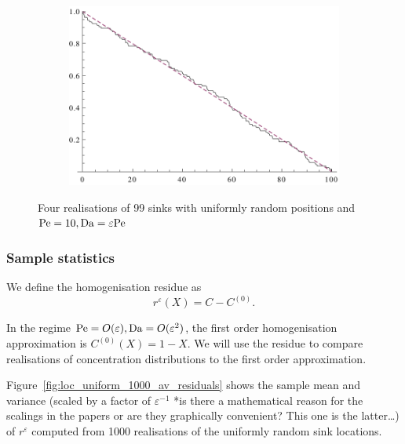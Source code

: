 \begin{figure}[ht!]
\begin{subfigure}[b]{0.45\textwidth}
    \end{subfigure}
    \begin{subfigure}[b]{0.45\textwidth}
        \centering
        \includegraphics[scale=0.5]{continuum/figures/loc_uniform_dist/4}
    \end{subfigure}
    \caption{\label{fig:99_sinks_uni_pos}Four realisations of 99 sinks with
    uniformly random positions and
        \({\mathrm{Pe}=10}, {\mathrm{Da}=\varepsilon\mathrm{Pe}}\)}
\end{figure}

\FloatBarrier

\subsubsection{Sample statistics}
We define the homogenisation residue as
\begin{equation}
    \label{eqn:homogenisation_residue}
    r^\varepsilon(X) = C - C^{(0)}.
\end{equation}

In the regime \(\mathrm{Pe} = O(\varepsilon), \mathrm{Da} = O(\varepsilon^2)\), the
first order homogenisation approximation is \(C^{(0)}(X) = 1 - X\). We will use
the residue to compare realisations of concentration distributions to the first
order approximation.

Figure~\ref{fig:loc_uniform_1000_av_residuals} shows the sample mean and
variance (scaled by a factor of \(\varepsilon^{-1}\) *is there a mathematical
reason for the scalings in the papers or are they graphically convenient? This
one is the latter\ldots*) of
\(r^\varepsilon\) computed from 1000 realisations of the uniformly random sink
locations.


